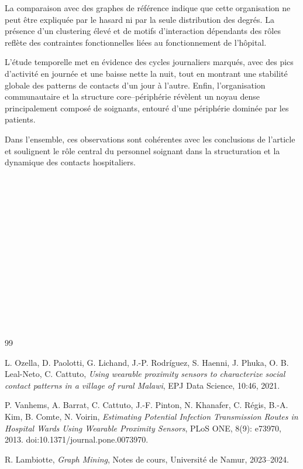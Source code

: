 \documentclass[10pt,twocolumn]{article}
\begin{document}
La comparaison avec des graphes de référence indique que cette organisation
ne peut être expliquée par le hasard ni par la seule distribution des degrés.
La présence d’un clustering élevé et de motifs d’interaction dépendants des rôles
reflète des contraintes fonctionnelles liées au fonctionnement de l’hôpital.

L’étude temporelle met en évidence des cycles journaliers marqués,
avec des pics d’activité en journée et une baisse nette la nuit,
tout en montrant une stabilité globale des patterns de contacts d’un jour à l’autre.
Enfin, l’organisation communautaire et la structure core--périphérie
révèlent un noyau dense principalement composé de soignants,
entouré d’une périphérie dominée par les patients.

Dans l’ensemble, ces observations sont cohérentes avec les conclusions de l’article
et soulignent le rôle central du personnel soignant dans la structuration
et la dynamique des contacts hospitaliers.\\
\\
\\
\\
\\
\\
\\
\\
\\
\\
\\
\\
\\
\\
\\
\begin{thebibliography}{99}

L. Ozella, D. Paolotti, G. Lichand, J.-P. Rodríguez, S. Haenni,
J. Phuka, O. B. Leal-Neto, C. Cattuto,
\textit{Using wearable proximity sensors to characterize social contact patterns
in a village of rural Malawi},
EPJ Data Science, 10:46, 2021.

P. Vanhems, A. Barrat, C. Cattuto, J.-F. Pinton, N. Khanafer,
C. Régis, B.-A. Kim, B. Comte, N. Voirin,
\textit{Estimating Potential Infection Transmission Routes in Hospital Wards Using
Wearable Proximity Sensors},
PLoS ONE, 8(9): e73970, 2013.
doi:10.1371/journal.pone.0073970.

R. Lambiotte,
\textit{Graph Mining},
Notes de cours, Université de Namur, 2023--2024.

\end{thebibliography}
\end{document}
